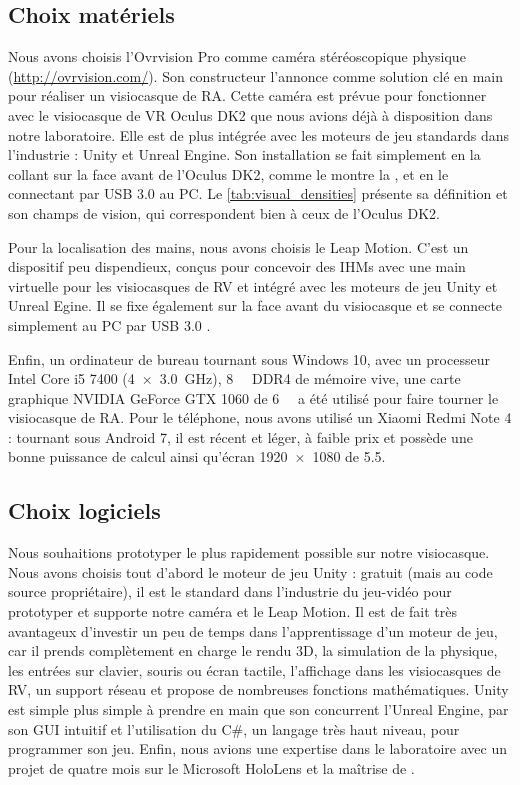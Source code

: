 \subsection{Choix matériels}
Nous avons choisis l'Ovrvision Pro comme caméra stéréoscopique physique (\url{http://ovrvision.com/}). Son constructeur l'annonce comme solution clé en main pour réaliser un visiocasque de RA. Cette caméra est prévue pour fonctionner avec le visiocasque de VR Oculus DK2 que nous avions déjà à disposition dans notre laboratoire. Elle est de plus intégrée avec les moteurs de jeu standards dans l'industrie : Unity et Unreal Engine. Son installation se fait simplement en la collant sur la face avant de l'Oculus DK2, comme le montre la , et en le connectant par USB 3.0 au PC. Le \autoref{tab:visual_densities} présente sa définition et son champs de vision, qui correspondent bien à ceux de l'Oculus DK2.

Pour la localisation des mains, nous avons choisis le Leap Motion. C'est un dispositif peu dispendieux, conçus pour concevoir des IHMs avec une main virtuelle pour les visiocasques de RV et intégré avec les moteurs de jeu Unity et Unreal Egine. Il se fixe également sur la face avant du visiocasque et se connecte simplement au PC par USB 3.0 .

Enfin, un ordinateur de bureau tournant sous Windows 10, avec un processeur Intel Core i5 7400 (\SI[product-units = single]{4x3.0}{\GHz}), \SI{8}{\giga\byte} DDR4 de mémoire vive, une carte graphique NVIDIA GeForce GTX 1060 de \SI{6}{\giga\byte} a été utilisé pour faire tourner le visiocasque de RA. Pour le téléphone, nous avons utilisé un Xiaomi Redmi Note 4 : tournant sous Android 7, il est récent et léger, à faible prix et possède une bonne puissance de calcul ainsi qu'écran \SI{1920x1080}{\px} de \SI{5.5}{\inch}.

\subsection{Choix logiciels}
\label{subsec:software_choices}
Nous souhaitions prototyper le plus rapidement possible sur notre visiocasque. Nous avons choisis tout d'abord le moteur de jeu Unity : gratuit (mais au code source propriétaire), il est le standard dans l'industrie du jeu-vidéo pour prototyper et supporte notre caméra et le Leap Motion. Il est de fait très avantageux d'investir un peu de temps dans l'apprentissage d'un moteur de jeu, car il prends complètement en charge le rendu 3D, la simulation de la physique, les entrées sur clavier, souris ou écran tactile, l'affichage dans les visiocasques de RV, un support réseau et propose de nombreuses fonctions mathématiques. Unity est simple plus simple à prendre en main que son concurrent l'Unreal Engine, par son GUI intuitif et l'utilisation du C\#, un langage très haut niveau, pour programmer son jeu. Enfin, nous avions une expertise dans le laboratoire avec un projet de quatre mois sur le Microsoft HoloLens et la maîtrise de \cite{Millette2016}.

